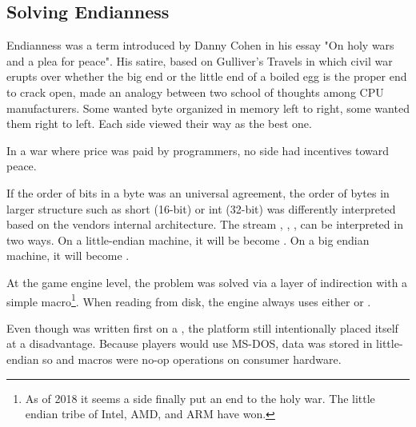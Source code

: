 \subsection{Solving Endianness}
Endianness was a term introduced by Danny Cohen in his essay "On holy wars and a plea for peace". His satire, based on Gulliver's Travels in which civil war erupts over whether the big end or the little end of a boiled egg is the proper end to crack open, made an analogy between two school of thoughts among CPU manufacturers. Some wanted byte organized in memory left to right, some wanted them right to left. Each side viewed their way as the best one.\\
\par
In a war where price was paid by programmers, no side had incentives toward peace.\\
\par
If the order of bits in a byte was an universal agreement, the order of bytes in larger structure such as short (16-bit) or int (32-bit) was differently interpreted based on the vendors internal architecture. The stream , , ,  can be interpreted in two ways. On a little-endian machine, it will be become . On a big endian machine, it will become .\\
\par
{}
\par
At the game engine level, the problem was solved via a layer of indirection with a simple macro\footnote{As of 2018 it seems a side finally put an end to the holy war. The little endian tribe of Intel, AMD, and ARM have won.}. When reading from disk, the engine always uses either  or .\\
\par
{}
\par
{}
\par
Even though \doom was written first on a \NeXT, the platform still intentionally placed itself at a disadvantage. Because players would use MS-DOS, data was stored in little-endian so  and  macros were no-op operations on consumer hardware.\\

\par

